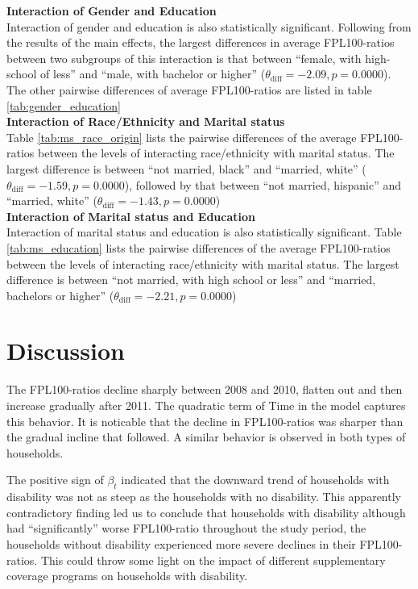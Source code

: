 \documentclass[11pt]{extarticle} %
\begin{document}
\noindent
{\bf{Interaction of Gender and Education}} \\
Interaction of gender and education is also statistically significant. Following from the results of the main effects, the largest differences in average FPL100-ratios between two subgroups of this interaction is that between ``female, with high-school of less'' and ``male, with bachelor or higher'' ($\theta_{\text{diff}} = -2.09, p = 0.0000 $). The other pairwise differences of average FPL100-ratios are listed in table \ref{tab:gender_education}\\
\noindent
{\bf{Interaction of Race/Ethnicity and Marital status}} \\
Table \ref{tab:ms_race_origin} lists the pairwise differences of the average FPL100-ratios between the levels of interacting race/ethnicity with marital status. The largest difference is between ``not married, black'' and ``married, white'' ($\theta_{\text{diff}} = -1.59, p = 0.0000 $), followed by that between ``not married, hispanic'' and ``married, white'' ($\theta_{\text{diff}} = -1.43, p = 0.0000 $) \\
\noindent
{\bf{Interaction of Marital status and Education}} \\
Interaction of marital status and education is also statistically significant. Table \ref{tab:ms_education} lists the pairwise differences of the average FPL100-ratios between the levels of interacting race/ethnicity with marital status. The largest difference is between ``not married, with high school or less'' and ``married, bachelors or higher'' ($\theta_{\text{diff}} = -2.21, p = 0.0000 $)\\

\section*{Discussion}
The FPL100-ratios decline sharply between 2008 and 2010, flatten out and then increase gradually after 2011. The quadratic term of Time in the model captures this behavior. It is noticable that the decline in FPL100-ratios was sharper than the gradual incline that followed. A similar behavior is observed in both types of households. 

The positive sign of $\beta_t$ indicated that the downward trend of households with disability was not as steep as the households with no disability. This apparently contradictory finding led us to conclude that households with disability although had ``significantly'' worse FPL100-ratio throughout the study period, the households without disability experienced more severe declines in their FPL100-ratios. This could throw some light on the impact of different supplementary coverage programs on households with disability.
\end{document}
